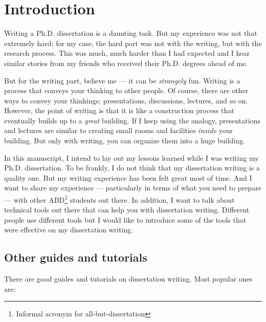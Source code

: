 \documentclass[11pt]{article}
\begin{document}
\section{Introduction}

Writing a Ph.D. dissertation is a daunting task. But my experience was not
that extremely hard; for my case, the hard part was not with the writing, but
with the research process. This was much, much harder than I had expected 
and I hear similar stories from my friends who received their Ph.D. degrees ahead
of me.

But for the writing part, believe me --- it can be \emph{strangely} fun.
Writing is a process that conveys your thinking to other people.  Of course,
there are other ways to convey your thinkings; presentations, discussions,
lectures, and so on.  However, the point of writing is that it is like a
construction process that eventually builds up to a \emph{great} building. If
I keep using the analogy, presentations and lectures are similar to creating
small rooms and facilities \emph{inside} your building. But only with writing,
you can organize them into a huge building.

In this manuscript, I intend to lay out my lessons learned while I was writing
my Ph.D. dissertation. To be frankly, I do not think that my dissertation
writing is a quality one. But my writing experience has been felt great most
of time. And I want to share my experience --- particularly in terms of what
you need to prepare --- with other ABD\footnote{Informal acronym for
all-but-dissertation} students out there. In addition, I want to talk about
technical tools out there that can help you with dissertation writing.
Different people use different tools but I would like to introduce some of the
tools that were effective on my dissertation writing. 

\subsection{Other guides and tutorials}
There are good guides and tutorials on dissertation writing. Most popular ones are:
\end{document}
